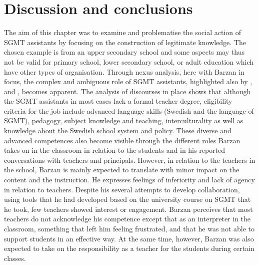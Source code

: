 \documentclass[output=paper]{langscibook}
\begin{document}
\section{Discussion and conclusions}
\begin{sloppypar}
The aim of this chapter was to examine and problematise the social action of SGMT assistants by focusing on the construction of legitimate knowledge. The chosen example is from an upper secondary school and some aspects may thus not be valid for primary school, lower secondary school, or adult education which have other types of organisation. Through nexus analysis, here with Barzan in focus, the complex and ambiguous role of SGMT assistants, highlighted also by \citet{Rosen2019-1, Rosen2020}, \citet{Reath_warren2017} and \citet{St_john2021}, becomes apparent. The analysis of discourses in place shows that although the SGMT assistants in most cases lack a formal teacher degree, eligibility criteria for the job include advanced language skills (Swedish and the language of SGMT), pedagogy, subject knowledge and teaching, interculturality as well as knowledge about the Swedish school system and policy. These diverse and advanced competences also become visible through the different roles Barzan takes on in the classroom in relation to the students and in his reported conversations with teachers and principals. However, in relation to the teachers in the school, Barzan is mainly expected to translate with minor impact on the content and the instruction. He expresses feelings of inferiority and lack of agency in relation to teachers.  Despite his several attempts to develop collaboration, using tools that he had developed based on the university course on SGMT that he took, few teachers showed interest or engagement. Barzan perceives that most teachers do not acknowledge his competence except that as an interpreter in the classroom, something that left him feeling frustrated, and that he was not able to support students in an effective way. At the same time, however, Barzan was also expected to take on the responsibility as a teacher for the students during certain classes.
\end{sloppypar}
\end{document}
